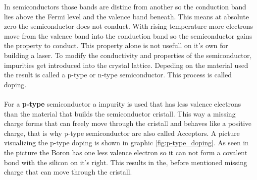 In semiconductors those bands are distinc from another so the conduction band lies above the Fermi level and the valence band beneath.
This means at absolute zero the semiconductor does not conduct.
With rising temperature more electrons move from the valence band into the conduction band so the semiconductor gains the property to conduct.
This property alone is not usefull on it's own for building a laser.
To modify the conductivity and properties of the semiconductor, impurities get introduced into the crystal lattice.
Depeding on the material used the result is called a p-type or n-type semiconductor.
This process is called doping.
\\\\
\FloatBarrier
For a \textbf{p-type} semiconductor a impurity is used that has less valence electrons than the material that builds the semiconductor cristall.
This way a missing charge forms that can freely move through the cristall and behaves like a positive charge, that is why p-type semiconductor are also called Acceptors.
A picture visualizing the p-type doping is shown in graphic \ref{fig:p-type_doping}.
As seen in the picture the Boron has one less valence electron so it can not form a covalent bond with the silicon on it's right.
This results in the, before mentioned missing charge that can move through the cristall.
